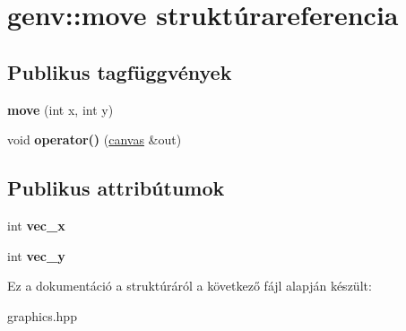 \hypertarget{structgenv_1_1move}{}\section{genv\+:\+:move struktúrareferencia}
\label{structgenv_1_1move}
\subsection*{Publikus tagfüggvények}
\begin{DoxyCompactItemize}
\item 
\mbox{\label{structgenv_1_1move_afbf98ade6de4261999af994168551615}} 
{\bfseries move} (int x, int y)
\item 
\mbox{\label{structgenv_1_1move_ab8dd0ef18914ea6301966162752db392}} 
void {\bfseries operator()} (\hyperlink{classgenv_1_1canvas}{canvas} \&out)
\end{DoxyCompactItemize}
\subsection*{Publikus attribútumok}
\begin{DoxyCompactItemize}
\item 
\mbox{\label{structgenv_1_1move_a94403aa1940b3071703da3217bfe300c}} 
int {\bfseries vec\+\_\+x}
\item 
\mbox{\label{structgenv_1_1move_ac957a49d9446552a00537db4177c4fb1}} 
int {\bfseries vec\+\_\+y}
\end{DoxyCompactItemize}


Ez a dokumentáció a struktúráról a következő fájl alapján készült\+:\begin{DoxyCompactItemize}
\item 
graphics.\+hpp\end{DoxyCompactItemize}
